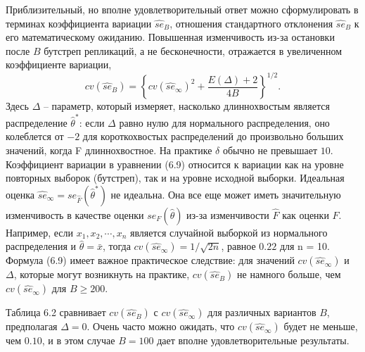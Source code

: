 Приблизительный, но вполне удовлетворительный ответ можно сформулировать в терминах коэффициента вариации $\widehat{se}_B$, отношения стандартного отклонения $\widehat{se}_B$ к его математическому ожиданию. Повышенная изменчивость из-за остановки после $B$ бутстреп репликаций, а не бесконечности, отражается в увеличенном коэффициенте вариации,
\begin{equation}
    cv(\widehat{se}_B)=\left\{cv(\widehat{se}_\infty)^2+\frac{E(\Delta)+2}{4B}\right\}^{1/2}.
\end{equation}
Здесь $\Delta$ -- параметр, который измеряет, насколько длиннохвостым является распределение $\hat\theta^*$: если $\Delta$ равно нулю для нормального распределения, оно колеблется от $-2$ для короткохвостых распределений до произвольно больших значений, когда F длиннохвостное. На практике $\delta$ обычно не превышает $10$. Коэффициент вариации в уравнении (6.9) относится к вариации как на уровне повторных выборок (бутстреп), так и на уровне исходной выборки. Идеальная оценка $\widehat{se}_\infty = se_{\hat F}(\hat\theta^*)$ не идеальна. Она все еще может иметь значительную изменчивость в качестве оценки $se_F(\hat\theta)$ из-за изменчивости $\hat F$ как оценки $F$. Например, если $x_1, x_2, \cdots, x_n$ является случайной выборкой из нормального распределения и $\hat\theta=\bar x$, тогда $cv(\widehat{se}_\infty)=1/\sqrt{2n}$, равное $0.22$ для n = 10. Формула (6.9) имеет важное практическое следствие: для значений $cv(\widehat{se}_\infty)$ и $\Delta$, которые могут возникнуть на практике, $cv(\widehat{se}_B)$ не намного больше, чем $cv(\widehat{se}_\infty)$ для $B\ge 200$. 

Таблица 6.2 сравнивает $cv(\widehat{se}_B)$ с $cv(\widehat{se}_\infty)$ для различных вариантов $B$, предполагая $\Delta = 0$. Очень часто можно ожидать, что $cv(\widehat{se}_\infty)$ будет не меньше, чем $0.10$, и в этом случае $B = 100$ дает вполне удовлетворительные результаты.
\newline

